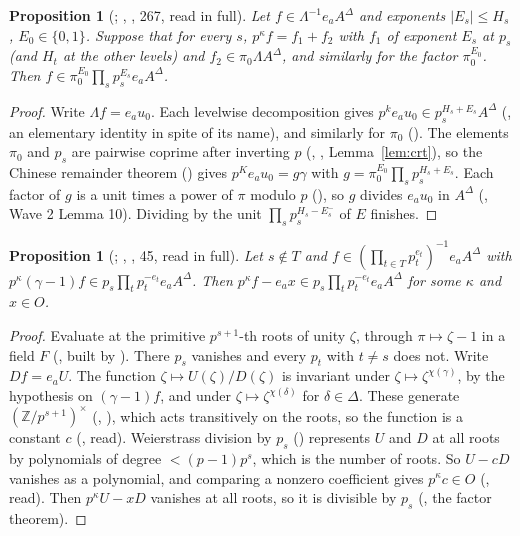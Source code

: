 \documentclass[11pt]{article}
\newtheorem{prop}[lemma]{Proposition}
\theoremstyle{definition}
\theoremstyle{remark}
\begin{document}
\begin{prop}[; , , 267, read in full]
Let $f\in\Lambda^{-1}e_aA^\Delta$ and exponents $|E_s|\le H_s$, $E_0\in\{0,1\}$. Suppose that for every $s$, $p^\kappa f=f_1+f_2$ with $f_1$ of exponent $E_s$ at $p_s$ (and $H_t$ at the other levels) and $f_2\in\pi_0\Lambda A^\Delta$, and similarly for the factor $\pi_0^{E_0}$. Then $f\in\pi_0^{E_0}\prod_sp_s^{E_s}e_aA^\Delta$.
\end{prop}
\begin{proof}
Write $\Lambda f=e_au_0$. Each levelwise decomposition gives $p^k e_au_0\in p_s^{H_s+E_s}A^\Delta$ (, an elementary identity in spite of its name), and similarly for $\pi_0$ (). The elements $\pi_0$ and $p_s$ are pairwise coprime after inverting $p$ (, , Lemma~\ref{lem:crt}), so the Chinese remainder theorem () gives $p^Ke_au_0=g\gamma$ with $g=\pi_0^{E_0}\prod_sp_s^{H_s+E_s}$. Each factor of $g$ is a unit times a power of $\pi$ modulo $p$ (), so $g$ divides $e_au_0$ in $A^\Delta$ (, Wave 2 Lemma 10). Dividing by the unit $\prod_sp_s^{H_s-E_s^-}$ of $E$ finishes.
\end{proof}

\begin{prop}[; , , 45, read in full]
Let $s\notin T$ and $f\in(\prod_{t\in T}p_t^{e_t})^{-1}e_aA^\Delta$ with $p^\kappa(\gamma-1)f\in p_s\prod_tp_t^{-e_t}e_aA^\Delta$. Then $p^\kappa f-e_ax\in p_s\prod_tp_t^{-e_t}e_aA^\Delta$ for some $\kappa$ and $x\in O$.
\end{prop}
\begin{proof}
Evaluate at the primitive $p^{s+1}$-th roots of unity $\zeta$, through $\pi\mapsto\zeta-1$ in a field $F$ (, built by ). There $p_s$ vanishes and every $p_t$ with $t\ne s$ does not. Write $Df=e_aU$. The function $\zeta\mapsto U(\zeta)/D(\zeta)$ is invariant under $\zeta\mapsto\zeta^{\chi(\gamma)}$, by the hypothesis on $(\gamma-1)f$, and under $\zeta\mapsto\zeta^{\chi(\delta)}$ for $\delta\in\Delta$. These generate $(\mathbb Z/p^{s+1})^\times$ (, ), which acts transitively on the roots, so the function is a constant $c$ (, read). Weierstrass division by $p_s$ () represents $U$ and $D$ at all roots by polynomials of degree $<(p-1)p^s$, which is the number of roots. So $U-cD$ vanishes as a polynomial, and comparing a nonzero coefficient gives $p^{\kappa}c\in O$ (, read). Then $p^\kappa U-xD$ vanishes at all roots, so it is divisible by $p_s$ (, the factor theorem).
\end{proof}
\end{document}
